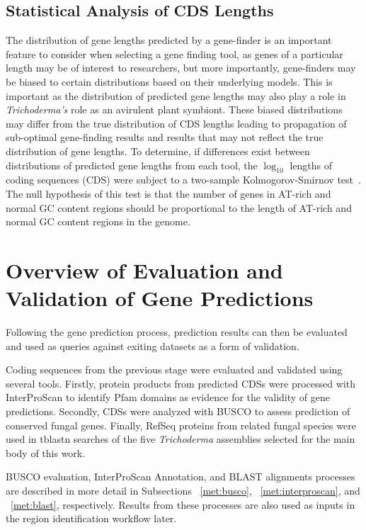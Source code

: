 \subsection{Statistical Analysis of CDS Lengths}
\label{met:cds-stats}
The distribution of gene lengths predicted by a gene-finder is an
important feature to consider when selecting a gene finding tool, as
genes of a particular length may be of interest to researchers, but
more importantly, gene-finders may be biased to certain distributions
based on their underlying models. This is important as the
distribution of predicted gene lengths may also play a role in
\textit{Trichoderma's} role as an avirulent plant symbiont. These
biased distributions may differ from the true distribution of CDS
lengths leading to propagation of sub-optimal gene-finding results and
results that may not reflect the true distribution of gene lengths. To
determine, if differences exist between distributions of predicted
gene lengths from each tool, the $\log_{10}$ lengths of coding
sequences (CDS) were subject to a two-sample Kolmogorov-Smirnov
test~\cite{2008}. The null hypothesis of this test is that the number of genes in AT-rich and normal GC content regions should be proportional to the length of AT-rich and normal GC content regions in the genome.

\section{Overview of Evaluation and Validation of Gene Predictions}
\label{met:valid-workflow}

Following the gene prediction process, prediction results can then be
evaluated and used as queries against exiting datasets as a form of
validation. 

Coding sequences from the previous stage were evaluated and validated
using several tools. Firstly, protein products from predicted CDSs
were processed with InterProScan to identify Pfam domains as evidence
for the validity of gene predictions. Secondly, CDSs were analyzed
with BUSCO to assess prediction of conserved fungal genes. Finally,
RefSeq proteins from related fungal species were used in tblastn
searches of the five \textit{Trichoderma} assemblies selected for the
main body of this work.

BUSCO evaluation, InterProScan Annotation, and BLAST alignments
processes are described in more detail in Subsections ~\ref{met:busco},
~\ref{met:interproscan}, and ~\ref{met:blast}, respectively. Results
from these processes are also used as inputs in the region
identification workflow later.

